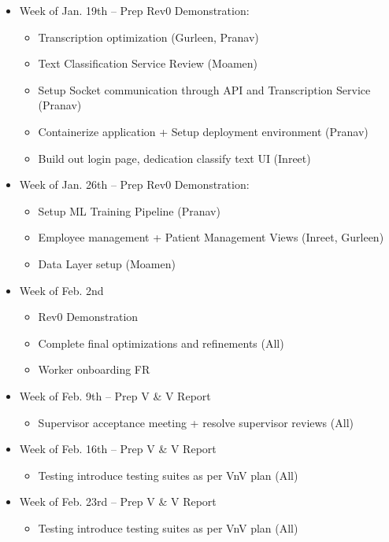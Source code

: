 \documentclass[12pt]{article}
\begin{document}
\begin{itemize}
  \item Week of Jan. 19th -- Prep Rev0 Demonstration:
    \begin{itemize}
      \item Transcription optimization (Gurleen, Pranav)
      \item Text Classification Service Review (Moamen)
      \item Setup Socket communication through API and Transcription Service (Pranav)
      \item Containerize application + Setup deployment environment (Pranav)
      \item Build out login page, dedication classify text UI (Inreet)
    \end{itemize}
  \item Week of Jan. 26th -- Prep Rev0 Demonstration:
    \begin{itemize}
      \item Setup ML Training Pipeline (Pranav)
      \item Employee management + Patient Management Views (Inreet, Gurleen)
      \item Data Layer setup (Moamen)
    \end{itemize}
  \item Week of Feb. 2nd
    \begin{itemize}
      \item Rev0 Demonstration
      \item Complete final optimizations and refinements (All)
      \item Worker onboarding FR
    \end{itemize}
  \item Week of Feb. 9th -- Prep V \& V Report
    \begin{itemize}
      \item Supervisor acceptance meeting + resolve supervisor reviews (All)
    \end{itemize}
  \item Week of Feb. 16th -- Prep V \& V Report
    \begin{itemize}
      \item Testing introduce testing suites as per VnV plan (All)
    \end{itemize}
  \item Week of Feb. 23rd -- Prep V \& V Report
    \begin{itemize}
      \item Testing introduce testing suites as per VnV plan (All)

\end{itemize}
\end{itemize}
\end{document}

